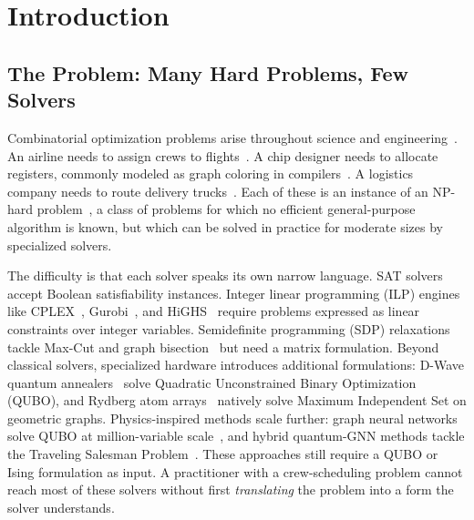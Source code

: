 \documentclass[conference]{IEEEtran}
\begin{document}
\section{Introduction}\label{sec:intro}

\subsection{The Problem: Many Hard Problems, Few Solvers}

Combinatorial optimization problems arise throughout science and engineering~\cite{korte2008combinatorial,Schuetz2022PhysicsGNN}.
An airline needs to assign crews to flights~\cite{gopalakrishnan2005airline}.
A chip designer needs to allocate registers, commonly modeled as graph coloring in compilers~\cite{chaitin1981register}.
A logistics company needs to route delivery trucks~\cite{toth2014vehicle}.
Each of these is an instance of an NP-hard problem~\cite{karp1972,garey1979}, a class of problems for which no efficient general-purpose algorithm is known, but which can be solved in practice for moderate sizes by specialized solvers.

The difficulty is that each solver speaks its own narrow language.
SAT solvers~\cite{Een2003MiniSat, Biere2020Kissat} accept Boolean satisfiability instances.
Integer linear programming (ILP) engines like CPLEX~\cite{IBM2022CPLEX}, Gurobi~\cite{Gurobi2026}, and HiGHS~\cite{Huangfu2018HiGHS} require problems expressed as linear constraints over integer variables.
Semidefinite programming (SDP) relaxations tackle Max-Cut and graph bisection~\cite{GoemansWilliamson1995} but need a matrix formulation.
Beyond classical solvers, specialized hardware introduces additional formulations: D-Wave quantum annealers~\cite{glover2019} solve Quadratic Unconstrained Binary Optimization (QUBO), and Rydberg atom arrays~\cite{lucas2014, pichler2018, ebadi2022quantum} natively solve Maximum Independent Set on geometric graphs.
Physics-inspired methods scale further: graph neural networks solve QUBO at million-variable scale~\cite{Schuetz2022PhysicsGNN}, and hybrid quantum-GNN methods tackle the Traveling Salesman Problem~\cite{He2024QuantumTSP}.
These approaches still require a QUBO or Ising formulation as input.
A practitioner with a crew-scheduling problem cannot reach most of these solvers without first \emph{translating} the problem into a form the solver understands.
\end{document}
